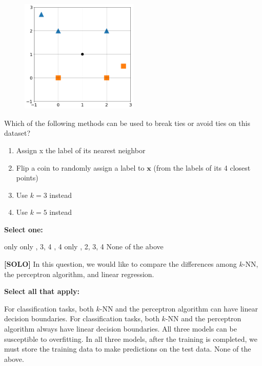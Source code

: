 \documentclass[11pt,addpoints,answers]{exam}
\newcommand{\xv}{\mathbf{x}}
\begin{document}
\begin{questions}
    \begin{figure}[H]
        \centering
        \includegraphics[width = 0.5\textwidth]{images/1-1-5.png}
        \label{Q_5knn}
    \end{figure}
    
    Which of the following methods can be used to break ties or avoid ties on this dataset?
    
    \begin{enumerate}
        \item Assign x the label of its nearest neighbor
        \item Flip a coin to randomly assign a label to $\xv$ (from the labels of its 4 closest points)
        \item Use $k = 3$ instead
        \item Use $k = 5$ instead
    \end{enumerate}

    \textbf{Select one:}
    \begin{checkboxes}
         only
         only
        , 3, 4
        , 4
         only
        , 2, 3, 4
        \choice None of the above
    \end{checkboxes}
    
 
    
    \newpage
    
    \question[2] \textbf{[SOLO]} In this question, we would like to compare the differences among $k$-NN, the perceptron algorithm, and linear regression.
    
    {
    \checkboxchar{$\Box$} \checkedchar{$\blacksquare$}
    \textbf{Select all that apply:}
    \begin{checkboxes}
        \CorrectChoice For classification tasks, both $k$-NN and the perceptron algorithm can have linear decision boundaries.
        \choice For classification tasks, both $k$-NN and the perceptron algorithm always have linear decision boundaries.
        \CorrectChoice All three models can be susceptible to overfitting.
        \choice In all three models, after the training is completed, we must store the training data to make predictions on the test data.
        \choice None of the above.
    \end{checkboxes}
    }


\end{questions}
\end{document}
